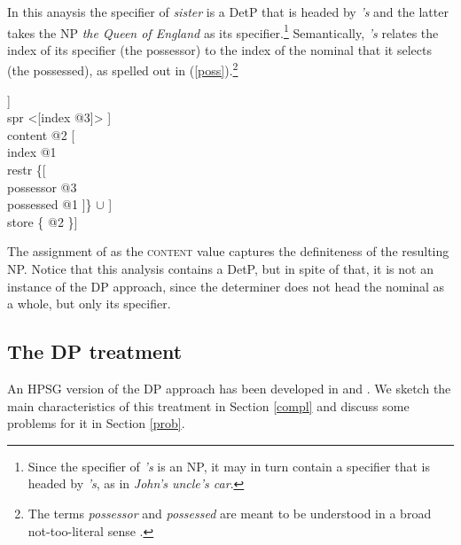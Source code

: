 \documentclass[output=paper
                ,modfonts
                ,nonflat
	        ,collection
	        ,collectionchapter
	        ,collectiontoclongg
 	        ,biblatex
                ,babelshorthands
                ,newtxmath
                ,draftmode
                ,colorlinks, citecolor=brown
]{./langsci/langscibook}
\begin{document}
In this anaysis the specifier of \emph{sister} is a DetP that is headed by \emph{'s} 
and the latter takes the NP \emph{the Queen of England} as its specifier.\footnote{Since the 
specifier of \emph{'s} is an NP, it may in turn contain a specifier that is headed 
by \emph{'s}, as in \emph{John's uncle's car}.}
Semantically, \emph{'s} relates the index of its specifier (the possessor) to the index
of the nominal that it selects (the possessed), as spelled out in (\ref{poss}).\footnote{The
terms \emph{possessor} and \emph{possessed} are meant to be understood in a broad not-too-literal 
sense \citep{Nerbonne92}.}     

\begin{exe} 
\ex\label{poss}
\begin{avm}
[category [head [\type{determiner}                \\
                 spec [\type{parameter}           \\
                       index @1                   \\
                       restr \avmbox{$\Sigma$} ]] \\
           spr <[index @3]> ]                     \\
 content @2 [                       \\
               index @1                           \\
               restr \{[           \\
                          possessor @3            \\
                          possessed @1 ]\} $\cup$ \avmbox{$\Sigma$} ] \\
 store \{ @2 \}]  
\end{avm}
\end{exe}

\noindent
The assignment of  as the \textsc{content} value captures 
the definiteness of the resulting NP. Notice that this analysis contains a DetP, 
but in spite of that, it is not an instance of the DP approach, since the 
determiner does not head the nominal as a whole, but only its specifier. 


\subsection{The DP treatment} 
\label{dpt} 


An HPSG version of the DP approach has been developed in \citet{Netter94} and 
\citet{Netter96}. We sketch the main characteristics of this treatment in Section \ref{compl}
and discuss some problems for it in Section \ref{prob}. 
\end{document}
